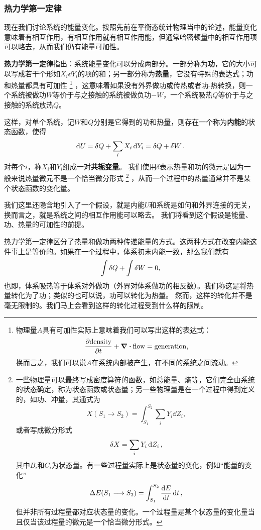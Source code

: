 \documentclass[hyperref, UTF8, a4paper]{ctexart}
\begin{document}
\subsubsection{热力学第一定律}

现在我们讨论系统的能量变化。按照先前在平衡态统计物理当中的论述，能量变化意味着有相互作用，有相互作用就有相互作用能，但通常哈密顿量中的相互作用项可以略去，从而我们仍有能量可加性。

\textbf{热力学第一定律}指出：系统能量变化可以分成两部分。一部分称为\textbf{功}，它的大小可以写成若干个形如$X_i \dd{Y_i}$的项的和；另一部分称为\textbf{热量}，它没有特殊的表达式；功和热量都具有可加性%
\footnote{
    物理量$A$具有可加性实际上意味着我们可以写出这样的表达式：
    \[
        \pdv{\text{density}}{t} + \div{\text{flow}} = \text{generation},
    \]
    换而言之，我们可以说$A$在系统内部被产生，在不同的系统之间流动。
}
，这意味着如果没有外界做功或传热或者功-热转换，则一个系统被做功$W$等价于与之接触的系统被做负功$-W$，一个系统吸热$Q$等价于与之接触的系统放热$Q$。

这样，对单个系统，记$W$和$Q$分别是它得到的功和热量，则存在一个称为\textbf{内能}的状态函数，使得
\begin{equation}
    \dd{U} = \delta{Q} + \sum_i X_i \dd{Y_i} = \var{Q} + \var{W}.
    \label{eq:thermodynamics-first-law}
\end{equation}
对每个$i$，称$X_i$和$Y_i$组成一对\textbf{共轭变量}。
我们使用$\delta$表示热量和功的微元是因为一般来说热量微元不是一个恰当微分形式%
\footnote{一些物理量可以最终写成密度算符的函数，如总能量、熵等，它们完全由系统的状态确定，称为状态函数或状态量；另一些物理量是在一个过程中得到定义的，如功、冲量，其通式为
\[
    X(S_1 \longrightarrow S_2) = \int_{S_1}^{S_2} \sum_i Y_i \dd{Z_i},
\]
或者写成微分形式
\[
    \var{X} = \sum_i Y_i \dd{Z_i},
\]
其中$B_i$和$C_i$为状态量。有一些过程量实际上是状态量的变化，例如“能量的变化”
\[
    \Delta E (S_1 \longrightarrow S_2) = \int_{S_1}^{S_2} \dv{E}{t} \dd{t},
\]
但并非所有过程量都对应状态量的变化。一个过程量是某个状态量的变化量当且仅当该过程量的微元是一个恰当微分形式。}%
，从而一个过程中的热量通常并不是某个状态函数的变化量。

我们这里还隐含地引入了一个假设，就是内能$U$和系统是如何和外界连接的无关，换而言之，就是系统之间的相互作用能可以略去。
我们将看到这个假设是能量、功、热量的可加性的前提。

热力学第一定律区分了热量和做功两种传递能量的方式。这两种方式在改变内能这件事上是等价的。如果在一个过程中，体系初末内能一致，那么我们就有
\[
    \int \var{Q} + \int \var{W} = 0,
\]
也即，体系吸热等于体系对外做功（外界对体系做功的相反数）。我们称这是将热量转化为了功；类似的也可以说，功可以转化为热量。
然而，这样的转化并不是毫无限制的。我们马上会看到这样的转化过程受到什么样的限制。
\end{document}

